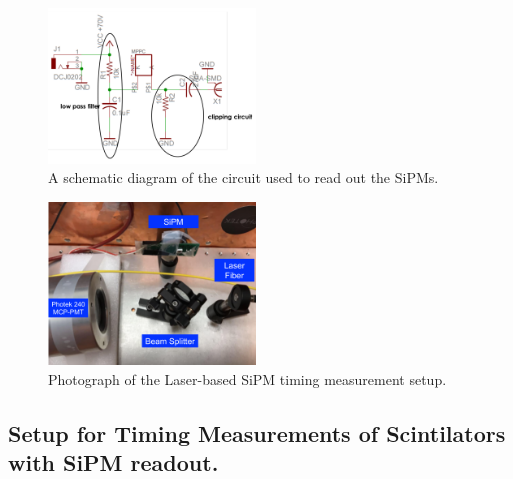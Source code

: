 \begin{figure}[htbp]
\centering
\includegraphics[width=0.49\textwidth]{figures/CircuitDiagram.pdf}
\caption{A schematic diagram of the circuit used to read out the SiPMs.}
\label{fig:Circuit}
\end{figure}


\begin{figure}[htbp] 
\centering
\includegraphics[width=0.49\textwidth]{figures/SiPMSetup1.pdf} 
\caption{Photograph of the Laser-based SiPM timing measurement setup.} 
\label{fig:laserSetup} 
\end{figure} 

\subsection{Setup for Timing Measurements of Scintilators with SiPM readout.}

